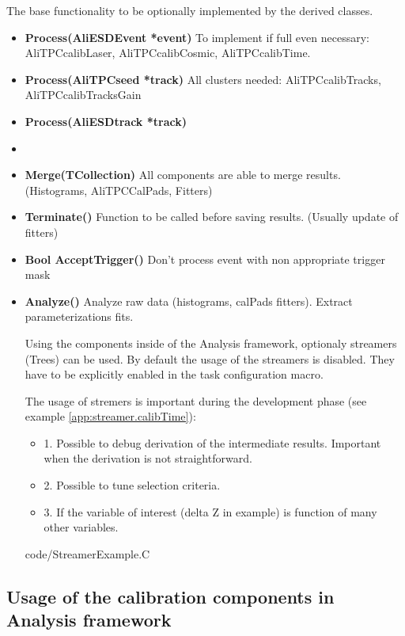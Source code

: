\documentclass[a4paper,12pt]{article}
\newcommand{\CodeMacro}[2]
{
  
{code/#1}
}
\begin{document}
The base functionality to be optionally implemented by the derived classes.
\begin{itemize}
\item {\bf{Process(AliESDEvent *event)}} To implement if full even necessary: AliTPCcalibLaser, AliTPCcalibCosmic, AliTPCcalibTime.
\item {\bf{Process(AliTPCseed  *track)}} All clusters needed: AliTPCcalibTracks, AliTPCcalibTracksGain
\item {\bf{Process(AliESDtrack *track)}}
\item
\item {\bf{Merge(TCollection)}} All components are able to merge results. (Histograms, AliTPCCalPads, Fitters) 
\item {\bf{Terminate()}}        Function to be called before saving results. (Usually update of fitters)
\item {\bf{Bool AcceptTrigger()}} Don't process event with non appropriate trigger mask           
\item {\bf{Analyze()}}          Analyze raw data (histograms, calPads fitters). Extract parameterizations fits.

Using the components inside of the Analysis framework, optionaly streamers (Trees)  can be used. 
By default the usage of the streamers is disabled. They have to be explicitly enabled in the task 
configuration macro. 

The usage of stremers is important during the development phase (see example \ref{app:streamer.calibTime}):
\begin{itemize}
\item 1. Possible to debug derivation of the intermediate results. Important when the derivation is not straightforward.
\item 2. Possible to tune selection criteria.
\item 3. If the variable of interest (delta Z in example) is function of many other variables.  
\end{itemize}

\CodeMacro{StreamerExample.C}{app:streamer.calibTime}



\end{itemize}


\subsection{Usage of the calibration components in Analysis framework}
\end{document}
